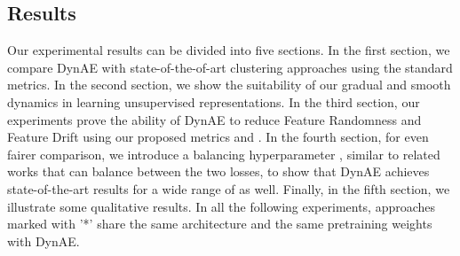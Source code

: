\documentclass{article}
\begin{document}
\subsection{Results}
Our experimental results can be divided into five sections. In the first section, we compare DynAE with state-of-the-of-art clustering approaches using the standard metrics. In the second section, we show the suitability of our gradual and smooth dynamics in learning unsupervised representations. In the third section, our experiments prove the ability of DynAE to reduce Feature Randomness and Feature Drift using our proposed metrics  and . In the fourth section, for even fairer comparison, we introduce a balancing hyperparameter , similar to related works \cite{paper27, paper28, paper29, paper36} that can balance between the two losses, to show that DynAE achieves state-of-the-art results for a wide range of  as well. Finally, in the fifth section, we illustrate some qualitative results. In all the following experiments, approaches marked with '*' share the same architecture and the same pretraining weights with DynAE.
\end{document}
